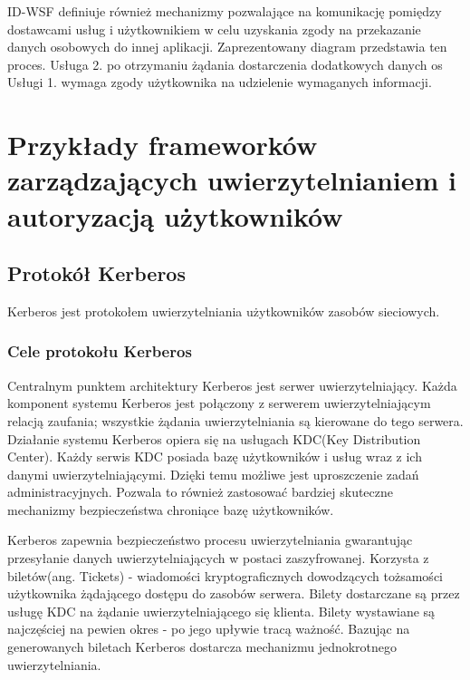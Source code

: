 	ID-WSF definiuje również mechanizmy pozwalające na komunikację pomiędzy dostawcami usług i użytkownikiem w celu uzyskania zgody na przekazanie danych osobowych do innej aplikacji. Zaprezentowany diagram przedstawia ten proces. Usługa 2. po otrzymaniu żądania dostarczenia dodatkowych danych os Usługi 1. wymaga zgody użytkownika na udzielenie wymaganych informacji.
	

\section{Przykłady frameworków zarządzających uwierzytelnianiem i autoryzacją użytkowników}
\label{sec:frameworki}

	\subsection{Protokół Kerberos}

		Kerberos jest protokołem uwierzytelniania użytkowników zasobów sieciowych.

		\subsubsection{Cele protokołu Kerberos}

			Centralnym punktem architektury Kerberos jest serwer uwierzytelniający\cite{Garman03}. Każda komponent systemu Kerberos jest połączony z serwerem uwierzytelniającym relacją zaufania; wszystkie żądania uwierzytelniania są kierowane do tego serwera. Działanie systemu Kerberos opiera się na usługach KDC(Key Distribution Center). Każdy serwis KDC posiada bazę użytkowników i usług wraz z ich danymi uwierzytelniającymi. Dzięki temu możliwe jest uproszczenie zadań administracyjnych. Pozwala to również zastosować bardziej skuteczne mechanizmy bezpieczeństwa chroniące bazę użytkowników.

			Kerberos zapewnia bezpieczeństwo procesu uwierzytelniania gwarantując przesyłanie danych uwierzytelniających w postaci zaszyfrowanej. Korzysta z biletów(ang. Tickets) - wiadomości kryptograficznych dowodzących tożsamości użytkownika żądającego dostępu do zasobów serwera. Bilety dostarczane są przez usługę KDC na żądanie uwierzytelniającego się klienta. Bilety wystawiane są najczęściej na pewien okres - po jego upływie tracą ważność. Bazując na generowanych biletach Kerberos dostarcza mechanizmu jednokrotnego uwierzytelniania. 

